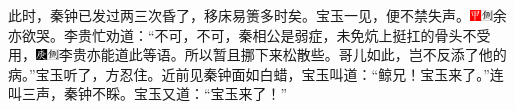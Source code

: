 此时，秦钟已发过两三次昏了，移床易箦多时矣。宝玉一见，便不禁失声。{\includegraphics[width=3mm]{../Images/00002}\includegraphics[width=3mm]{../Images/00011}\footnotesize \kaishu 余亦欲哭。}李贵忙劝道：``不可，不可，秦相公是弱症，未免炕上挺扛的骨头不受用，{\includegraphics[width=3mm]{../Images/00004}\includegraphics[width=3mm]{../Images/00011}\footnotesize \kaishu 李贵亦能道此等语。}所以暂且挪下来松散些。哥儿如此，岂不反添了他的病。''宝玉听了，方忍住。近前见秦钟面如白蜡，宝玉叫道：``鲸兄！宝玉来了。''连叫三声，秦钟不睬。宝玉又道：``宝玉来了！''

